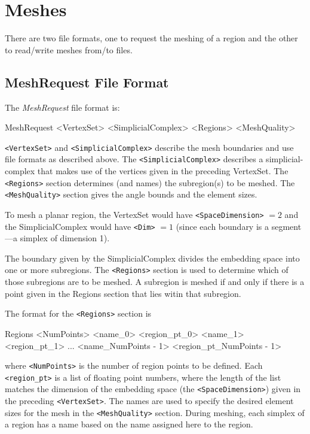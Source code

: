 \section{Meshes}
\label{MeshFF:Sec}

There are two file formats, one to request the meshing of a region and
the other to read/write meshes from/to files.

\subsection{MeshRequest File Format}

The {\em MeshRequest} file format is:

\begin{code}
MeshRequest
<VertexSet>
<SimplicialComplex>
<Regions>
<MeshQuality>
\end{code}
\noindent
\verb+<VertexSet>+ and \verb+<SimplicialComplex>+ 
describe the mesh boundaries and use file formats as described above.
The \verb+<SimplicialComplex>+ describes a simplicial-complex that
makes use of the vertices given in the preceding VertexSet.  The
\verb+<Regions>+ section determines (and names) the subregion(s) to be
meshed.  The \verb+<MeshQuality>+ section gives the angle bounds and
the element sizes.

To mesh a planar region, the VertexSet would have
\verb+<SpaceDimension>+ $= 2$ and the SimplicialComplex would have
\verb+<Dim>+ $= 1$ (since each boundary is a segment---a simplex of
dimension 1).

The boundary given by the SimplicialComplex divides the embedding
space into one or more subregions.  The \verb+<Regions>+ section is
used to determine which of those subregions are to be meshed.  A
subregion is meshed if and only if there is a point given in the
Regions section that lies witin that subregion.

The format for the \verb+<Regions>+ section is

\begin{code}
Regions <NumPoints>
<name_0> <region_pt_0>
<name_1> <region_pt_1>
...
<name_{NumPoints - 1}> <region_pt_{NumPoints - 1}>
\end{code}
\noindent
where \verb+<NumPoints>+ is the number of region points to be defined.
Each \verb+<region_pt>+ is a list of floating point numbers, where the
length of the list matches the dimension of the embedding space (the
\verb+<SpaceDimension>+) given in the preceding \verb+<VertexSet>+.
The names are used to specify the desired element sizes for the mesh
in the \verb+<MeshQuality>+ section.  During meshing, each simplex of
a region has a name based on the name assigned here to the region.


